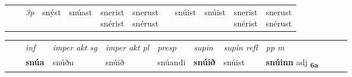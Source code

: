 \begin{tabular}{llllllllllll}
& &  {\textit{3p}} & snýst & snúast   & \specialcell{snerist\\ snérist} & \specialcell{snerust\\ snérust} & & snúist & snúist& \specialcell{snerist\\ snérist} & \specialcell{snerust\\ snérust}  \\*
\cmidrule{4-7} \cmidrule{9-12}
\end{tabular}


\begin{tabular}{llllllllllll}
 & & \textit{inf} & \textit{imper akt sg} & \textit{imper akt pl}   & \textit{presp} & \textit{supin} & \textit{supin refl} & \textit{pp m}     \\*
  & & \textbf{snúa} & snúðu  & snúið   & snúandi &  \textbf{snúið} & snúist & \textbf{snúinn} adj \textbf{\textsubscript{6a}} \\*
\cmidrule{1-12}
\end{tabular}




